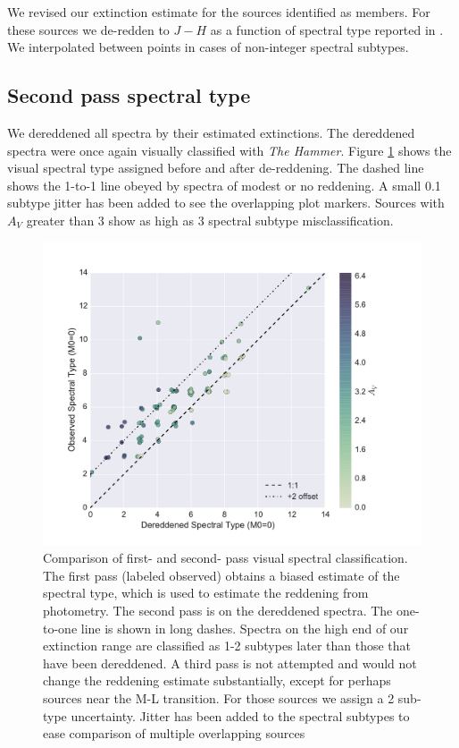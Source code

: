 \documentclass[12pt,preprint]{aastex}
\begin{document}
We revised our extinction estimate for the sources identified as members.  For these sources we de-redden to $J-H$ as a function of spectral type reported in \citet{2013ApJS..208....9P}.  We interpolated between points in cases of non-integer spectral subtypes.

\subsection{Second pass spectral type}
We dereddened all spectra by their estimated extinctions.  The dereddened spectra were once again visually classified with \emph{The Hammer}.  Figure \ref{fig_dereddened_comparison} shows the visual spectral type assigned before and after de-reddening.  The dashed line shows the 1-to-1 line obeyed by spectra of modest or no reddening.  A small 0.1 subtype jitter has been added to see the overlapping plot markers.  Sources with $A_V$ greater than 3 show as high as 3 spectral subtype misclassification.

\begin{figure}[ht!]
\caption{Comparison of first- and second- pass visual spectral classification.  The first pass (labeled observed) obtains a biased estimate of the spectral type, which is used to estimate the reddening from photometry.  The second pass is on the dereddened spectra.  The one-to-one line is shown in long dashes.  Spectra on the high end of our extinction range are classified as 1-2 subtypes later than those that have been dereddened.  A third pass is not attempted and would not change the reddening estimate substantially, except for perhaps sources near the M-L transition.  For those sources we assign a 2 sub-type uncertainty.  Jitter has been added to the spectral subtypes to ease comparison of multiple overlapping sources \label{fig_dereddened_comparison} }
\centering
\includegraphics[scale=0.5]{figures/dereddened_spt_comparison}
\end{figure}
\end{document}
